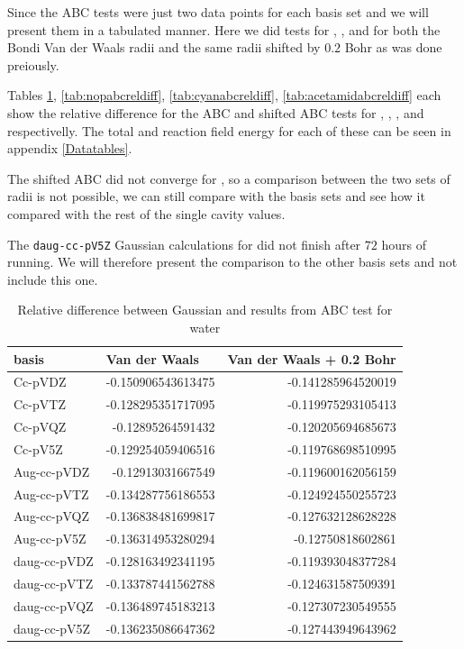 \documentclass[../master_thesis.tex]{subfiles}
\begin{document}
Since the \ac{ABC} tests were just two data points for each basis set and \newline\mrchem
we will present them in a tabulated manner. Here we did tests for , ,  and 
for both the Bondi Van der Waals radii and the same radii shifted by $0.2$ Bohr as was done preiously.

Tables \ref{tab:watabcreldiff}, \ref{tab:nopabcreldiff}, \ref{tab:cyanabcreldiff}, \ref{tab:acetamidabcreldiff}
each show the relative difference for the \ac{ABC} and shifted \ac{ABC} tests
for , , , and  respectivelly. The
total and  reaction field energy for each of these can be seen in appendix \ref{Datatables}.

The shifted \ac{ABC} did not converge for , so a comparison between the two sets
of radii is not possible, we can still compare with the basis sets and see how it compared with
the rest of the single cavity values.

The \verb!daug-cc-pV5Z! Gaussian calculations for  did not finish
after $72$ hours of running. We will therefore present the comparison to the other
basis sets and not include this one.

\begin{table}[htbp]
\caption{Relative difference between Gaussian and \mrchem results from \ac{ABC}  test for water}
\begin{tabular}{|l|r|r|}
\hline
basis & \multicolumn{1}{l|}{Van der Waals} & \multicolumn{1}{l|}{Van der Waals + 0.2 Bohr} \\ \hline
Cc-pVDZ & -0.150906543613475 & -0.141285964520019 \\ \hline
Cc-pVTZ & -0.128295351717095 & -0.119975293105413 \\ \hline
Cc-pVQZ & -0.12895264591432 & -0.120205694685673 \\ \hline
Cc-pV5Z & -0.129254059406516 & -0.119768698510995 \\ \hline
Aug-cc-pVDZ & -0.12913031667549 & -0.119600162056159 \\ \hline
Aug-cc-pVTZ & -0.134287756186553 & -0.124924550255723 \\ \hline
Aug-cc-pVQZ & -0.136838481699817 & -0.127632128628228 \\ \hline
Aug-cc-pV5Z & -0.136314953280294 & -0.12750818602861 \\ \hline
daug-cc-pVDZ & -0.128163492341195 & -0.119393048377284 \\ \hline
daug-cc-pVTZ & -0.133787441562788 & -0.124631587509391 \\ \hline
daug-cc-pVQZ & -0.136489745183213 & -0.127307230549555 \\ \hline
daug-cc-pV5Z & -0.136235086647362 & -0.127443949643962 \\ \hline
\end{tabular}
\label{tab:watabcreldiff}
\end{table}
\end{document}
